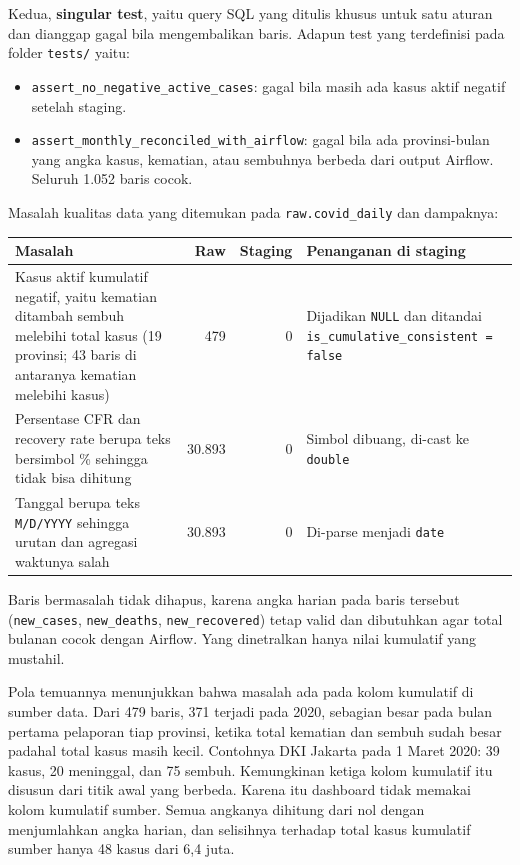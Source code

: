 \documentclass[11pt]{article}
\begin{document}
Kedua, \textbf{singular test}, yaitu query SQL yang ditulis khusus untuk satu
aturan dan dianggap gagal bila mengembalikan baris. Adapun test yang
terdefinisi pada folder \texttt{tests/} yaitu:

\begin{itemize}[nosep]
    \item \texttt{assert\_no\_negative\_active\_cases}: gagal bila masih ada kasus aktif negatif setelah staging.
    \item \texttt{assert\_monthly\_reconciled\_with\_airflow}: gagal bila ada provinsi-bulan yang angka kasus, kematian, atau sembuhnya berbeda dari output Airflow. Seluruh 1.052 baris cocok.
\end{itemize}

Masalah kualitas data yang ditemukan pada \texttt{raw.covid\_daily} dan dampaknya:

\begin{center}
\begin{minipage}{\linewidth}\centering\small
{}
\begin{tabular}{@{}p{6.4cm} r r p{5.0cm}@{}}
\toprule
\textbf{Masalah} & \textbf{Raw} & \textbf{Staging} & \textbf{Penanganan di staging} \\
\midrule
Kasus aktif kumulatif negatif, yaitu kematian ditambah sembuh melebihi total kasus (19 provinsi; 43 baris di antaranya kematian melebihi kasus) & 479 & 0 & Dijadikan \texttt{NULL} dan ditandai \texttt{is\_cumulative\_consistent = false} \\
Persentase CFR dan recovery rate berupa teks bersimbol \% sehingga tidak bisa dihitung & 30.893 & 0 & Simbol dibuang, di-cast ke \texttt{double} \\
Tanggal berupa teks \texttt{M/D/YYYY} sehingga urutan dan agregasi waktunya salah & 30.893 & 0 & Di-parse menjadi \texttt{date} \\
\bottomrule
\end{tabular}
\end{minipage}
\end{center}

Baris bermasalah tidak dihapus, karena angka harian pada baris tersebut
(\texttt{new\_cases}, \texttt{new\_deaths}, \texttt{new\_recovered}) tetap
valid dan dibutuhkan agar total bulanan cocok dengan Airflow. Yang
dinetralkan hanya nilai kumulatif yang mustahil.

Pola temuannya menunjukkan bahwa masalah ada pada kolom kumulatif di sumber
data. Dari 479 baris, 371 terjadi pada 2020, sebagian besar pada bulan pertama
pelaporan tiap provinsi, ketika total kematian dan sembuh sudah besar padahal
total kasus masih kecil. Contohnya DKI Jakarta pada 1 Maret 2020: 39 kasus,
20 meninggal, dan 75 sembuh. Kemungkinan ketiga kolom kumulatif itu disusun
dari titik awal yang berbeda. Karena itu dashboard tidak memakai kolom
kumulatif sumber. Semua angkanya dihitung dari nol dengan menjumlahkan angka
harian, dan selisihnya terhadap total kasus kumulatif sumber hanya 48 kasus
dari 6,4 juta.
\end{document}
